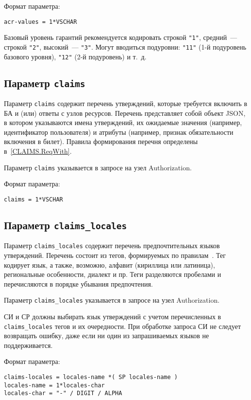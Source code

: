 Формат параметра:
\begin{lstlisting}
acr-values = 1*VSCHAR
\end{lstlisting}

Базовый уровень гарантий рекомендуется кодировать строкой \lstinline{"1"},
средний~--- строкой \lstinline{"2"}, высокий~--- \lstinline{"3"}.
%
Могут вводиться подуровни: \lstinline{"11"} (1-й подуровень базового уровня), 
\lstinline{"12"} (2-й подуровень) и т.~д.

\subsection{Параметр \lstinline{claims}}\label{PARAMS.Claims} 

Параметр \lstinline{claims} содержит перечень утверждений,
которые требуется включить в БА и (или) ответы с узлов ресурсов.
%
Перечень представляет собой объект JSON, в котором указываются 
имена утверждений, их ожидаемые значения (например, идентификатор пользователя) 
и атрибуты (например, признак обязательности включения в билет).
%
Правила формирования перечня определены в~\ref{CLAIMS.ReqWith}.

Параметр \lstinline{claims} указывается в запросе на узел Authorization.

Формат параметра:
\begin{lstlisting}
claims = 1*VSCHAR
\end{lstlisting}

\subsection{Параметр \lstinline{claims_locales}}\label{PARAMS.ClaimsLocales} 

Параметр \lstinline{claims_locales} содержит перечень предпочтительных 
языков утверждений.
%
Перечень состоит из тегов, формируемых по правилам~\cite{RFC5646}. 
%
Тег кодирует язык, а также, возможно, алфавит (кириллица или латиница), 
региональные особенности, диалект и пр. 
%
Теги разделяются пробелами и перечисляются в порядке убывания предпочтения.

Параметр \lstinline{claims_locales} указывается в запросе на узел Authorization.

СИ и СР должны выбирать язык утверждений с учетом перечисленных в 
\lstinline{claims_locales} тегов и их очередности. 
%
При обработке запроса СИ не следует возвращать ошибку, даже если ни один из 
запрашиваемых языков не поддерживается.

Формат параметра:
\begin{lstlisting}
claims-locales = locales-name *( SP locales-name )
locales-name = 1*locales-char
locales-char = "-" / DIGIT / ALPHA
\end{lstlisting}


